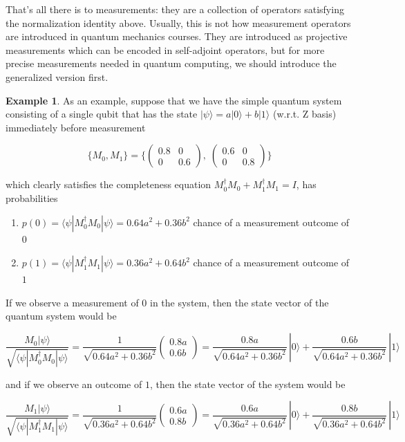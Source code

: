 \documentclass{article}
\theoremstyle{definition}
\newtheorem{example}{Example}[section]
\begin{document}
    That's all there is to measurements: they are a collection of operators satisfying the normalization identity above. Usually, this is not how measurement operators are introduced in quantum mechanics courses. They are introduced as projective measurements which can be encoded in self-adjoint operators, but for more precise measurements needed in quantum computing, we should introduce the generalized version first. 

    
    \begin{example}
      As an example, suppose that we have the simple quantum system consisting of a single qubit that has the state $|\psi \rangle = a|0\rangle + b|1 \rangle$  (w.r.t. Z basis) immediately before measurement

        \[\{M_0, M_1\} = \bigg\{ \begin{pmatrix} 0.8 & 0 \\  0 & 0.6 \end{pmatrix}, \; \begin{pmatrix} 0.6&0\\0&0.8 \end{pmatrix} \bigg\}\]

      which clearly satisfies the completeness equation $M_0^\dagger M_0 + M_1^\dagger M_1 = I$, has probabilities

      \begin{enumerate}
        \item $p(0) = \langle \psi | M_0^\dagger M_0 | \psi \rangle = 0.64 a^2 + 0.36b^2$ chance of a measurement outcome of $0$
        \item $p(1) = \langle \psi | M_1^\dagger M_1 | \psi \rangle = 0.36 a^2 + 0.64b^2$ chance of a measurement outcome of $1$
      \end{enumerate}

      If we observe a measurement of $0$ in the system, then the state vector of the quantum system would be

        \[\frac{M_0 | \psi\rangle}{\sqrt{\langle \psi | M_0^\dagger M_0 | \psi\rangle}} = \frac{1}{\sqrt{0.64a^2 + 0.36b^2}} \begin{pmatrix} 0.8a \\ 0.6b \end{pmatrix} = \frac{0.8a}{\sqrt{0.64a^2 + 0.36b^2}}\, |0 \rangle + \frac{0.6 b}{\sqrt{0.64a^2 + 0.36b^2}} \, |1\rangle\]

      and if we observe an outcome of $1$, then the state vector of the system would be

        \[\frac{M_1 | \psi\rangle}{\sqrt{\langle \psi | M_1^\dagger M_1 | \psi\rangle}} = \frac{1}{\sqrt{0.36a^2 + 0.64b^2}} \begin{pmatrix} 0.6a \\ 0.8b \end{pmatrix} = \frac{0.6a}{\sqrt{0.36a^2 + 0.64b^2}}\, |0 \rangle + \frac{0.8 b}{\sqrt{0.36a^2 + 0.64b^2}} \, |1\rangle\]
    \end{example}
\end{document}
